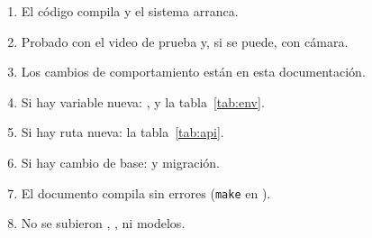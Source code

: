\begin{enumerate}
  \item[$\square$] El código compila y el sistema arranca.
  \item[$\square$] Probado con el video de prueba y, si se puede, con cámara.
  \item[$\square$] Los cambios de comportamiento están en esta documentación.
  \item[$\square$] Si hay variable nueva: , 
        y la tabla~\ref{tab:env}.
  \item[$\square$] Si hay ruta nueva: la tabla~\ref{tab:api}.
  \item[$\square$] Si hay cambio de base:  y migración.
  \item[$\square$] El documento compila sin errores (\texttt{make} en
        ).
  \item[$\square$] No se subieron , ,
         ni modelos.
\end{enumerate}
